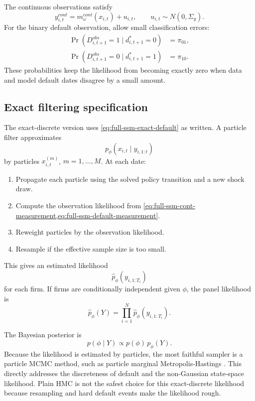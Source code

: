 \documentclass[11pt]{article}
\newcommand{\1}{\mathbf{1}}
\begin{document}
The continuous observations satisfy
\begin{equation}
  y^{cont}_{i,t}
  =
  m^{cont}_\omega(x_{i,t})
  +
  u_{i,t},
  \qquad
  u_{i,t}\sim N(0,\Sigma_y).
  \label{eq:full-ssm-cont-measurement}
\end{equation}
For the binary default observation, allow small classification errors:
\begin{equation}
\begin{aligned}
  \Pr(D_{i,t+1}^{obs}=1\mid d^*_{i,t+1}=0) &= \pi_{01},\\
  \Pr(D_{i,t+1}^{obs}=0\mid d^*_{i,t+1}=1) &= \pi_{10}.
\end{aligned}
\label{eq:full-ssm-default-measurement}
\end{equation}
These probabilities keep the likelihood from becoming exactly zero when data
and model default dates disagree by a small amount.

\subsection{Exact filtering specification}

The exact-discrete version uses \cref{eq:full-ssm-exact-default} as written. A
particle filter approximates
\[
  p_\phi(x_{i,t}\mid y_{i,1:t})
\]
by particles \(x_{i,t}^{(m)}\), \(m=1,\ldots,M\). At each date:
\begin{enumerate}[leftmargin=2em]
  \item Propagate each particle using the solved policy transition and a new
  shock draw.
  \item Compute the observation likelihood from
  \cref{eq:full-ssm-cont-measurement,eq:full-ssm-default-measurement}.
  \item Reweight particles by the observation likelihood.
  \item Resample if the effective sample size is too small.
\end{enumerate}
This gives an estimated likelihood
\[
  \widehat p_\phi(y_{i,1:T_i})
\]
for each firm. If firms are conditionally independent given \(\phi\), the panel
likelihood is
\begin{equation}
  \widehat p_\phi(Y)
  =
  \prod_{i=1}^N
  \widehat p_\phi(y_{i,1:T_i}).
  \label{eq:full-ssm-panel-likelihood}
\end{equation}

The Bayesian posterior is
\begin{equation}
  p(\phi\mid Y)
  \propto
  p(\phi)\,p_\phi(Y).
  \label{eq:full-ssm-panel-posterior}
\end{equation}
Because the likelihood is estimated by particles, the most faithful sampler is
a particle MCMC method, such as particle marginal Metropolis-Hastings
\citep{andrieu2010pmcmc}. This directly addresses the discreteness of default
and the non-Gaussian state-space likelihood. Plain HMC is not the safest
choice for this exact-discrete likelihood because resampling and hard default
events make the likelihood rough.
\end{document}
